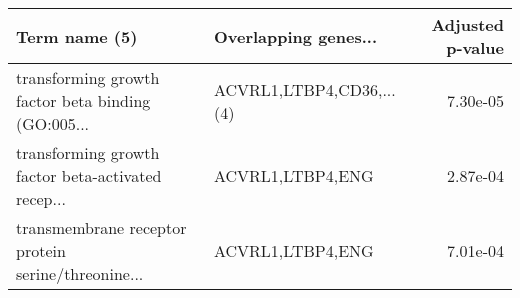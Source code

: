 \begin{tabular}{llr}
\toprule
                                     Term name (5) &     Overlapping genes... &  Adjusted p-value \\
\midrule
transforming growth factor beta binding (GO:005... & ACVRL1,LTBP4,CD36,...(4) &          7.30e-05 \\
transforming growth factor beta-activated recep... &         ACVRL1,LTBP4,ENG &          2.87e-04 \\
transmembrane receptor protein serine/threonine... &         ACVRL1,LTBP4,ENG &          7.01e-04 \\
\bottomrule
\end{tabular}
